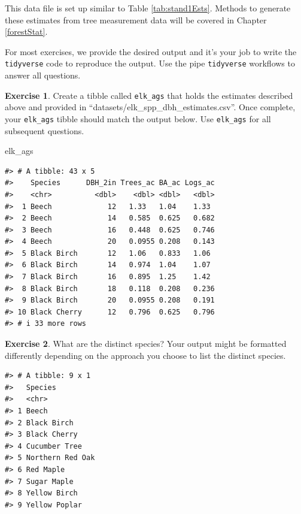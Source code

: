 \documentclass[
  11pt,
]{krantz}
\newenvironment{Shaded}{\begin{snugshade}}{\end{snugshade}}
\newcommand{\NormalTok}[1]{#1}
\theoremstyle{definition}
\theoremstyle{definition}
\theoremstyle{definition}
\newtheorem{exercise}{Exercise}[chapter]
\theoremstyle{definition}
\theoremstyle{remark}
\begin{document}
This data file is set up similar to Table \ref{tab:stand1Ests}. Methods to generate these estimates from tree measurement data will be covered in Chapter \ref{forestStat}.

For most exercises, we provide the desired output and it's your job to write the \texttt{tidyverse} code to reproduce the output. Use the pipe \texttt{tidyverse} workflows to answer all questions.

\begin{exercise}
\protect\hypertarget{exr:tidyr1}{}\label{exr:tidyr1}Create a tibble called \texttt{elk\_ags} that holds the estimates described above and provided in ``datasets/elk\_spp\_dbh\_estimates.csv''. Once complete, your \texttt{elk\_ags} tibble should match the output below. Use \texttt{elk\_ags} for all subsequent questions.
\end{exercise}

\begin{Shaded}
\begin{Highlighting}[]
\NormalTok{elk\_ags}
\end{Highlighting}
\end{Shaded}

\begin{verbatim}
#> # A tibble: 43 x 5
#>    Species      DBH_2in Trees_ac BA_ac Logs_ac
#>    <chr>          <dbl>    <dbl> <dbl>   <dbl>
#>  1 Beech             12   1.33   1.04    1.33 
#>  2 Beech             14   0.585  0.625   0.682
#>  3 Beech             16   0.448  0.625   0.746
#>  4 Beech             20   0.0955 0.208   0.143
#>  5 Black Birch       12   1.06   0.833   1.06 
#>  6 Black Birch       14   0.974  1.04    1.07 
#>  7 Black Birch       16   0.895  1.25    1.42 
#>  8 Black Birch       18   0.118  0.208   0.236
#>  9 Black Birch       20   0.0955 0.208   0.191
#> 10 Black Cherry      12   0.796  0.625   0.796
#> # i 33 more rows
\end{verbatim}

\begin{exercise}
\protect\hypertarget{exr:tidyr2}{}\label{exr:tidyr2}What are the distinct species? Your output might be formatted differently depending on the approach you choose to list the distinct species.
\end{exercise}

\begin{verbatim}
#> # A tibble: 9 x 1
#>   Species         
#>   <chr>           
#> 1 Beech           
#> 2 Black Birch     
#> 3 Black Cherry    
#> 4 Cucumber Tree   
#> 5 Northern Red Oak
#> 6 Red Maple       
#> 7 Sugar Maple     
#> 8 Yellow Birch    
#> 9 Yellow Poplar
\end{verbatim}
\end{document}
